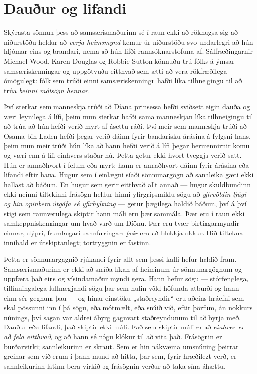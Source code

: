 \section*{Dauður og lifandi}

Skýrasta sönnun þess að samsærismaðurinn sé í raun ekki að rökhugsa sig að niðurstöðu heldur að \emph{verja heimsmynd} kemur úr niðurstöðu svo undarlegri að hún hljómar eins og brandari, nema að hún lifði rannsóknarstofuna af. Sálfræðingarnir Michael Wood, Karen Douglas og Robbie Sutton könnuðu trú fólks á ýmsar samsæriskenningar og uppgötvuðu eitthvað sem ætti að vera rökfræðilega ómögulegt: fólk sem trúði einni samsæriskenningu hafði líka tilhneigingu til að trúa \emph{beinni mótsögn hennar.}

Því sterkar sem manneskja trúði að Díana prinsessa hefði sviðsett eigin dauða og væri leynilega á lífi, þeim mun sterkar hafði sama manneskjan líka tilhneigingu til að trúa að hún hefði verið myrt af ásettu ráði. Því meir sem manneskja trúði að Osama bin Laden hefði þegar verið dáinn fyrir bandarísku árásina á fylgsni hans, þeim mun meir trúði hún líka að hann hefði verið á lífi þegar hermennirnir komu og væri enn á lífi einhvers staðar nú. Þetta getur ekki hvort tveggja verið satt. Hún er annaðhvort í felum eða myrt; hann er annaðhvort dáinn fyrir árásina eða lifandi eftir hana. Hugur sem í einlægni síaði sönnunargögn að sannleika gæti ekki hallast að báðum. En hugur sem gerir eitthvað allt annað — hugur skuldbundinn ekki neinni tiltekinni frásögn heldur hinni yfirgripsmiklu sögu að \emph{yfirvöldin ljúgi og hin opinbera útgáfa sé yfirhylming} — getur þægilega haldið báðum, því á því stigi sem raunverulega skiptir hann máli eru þær sammála. Þær eru í raun ekki samkeppniskenningar um hvað varð um Díönu. Þær eru tvær birtingarmyndir einnar, dýpri, frumlægari sannfæringar: \emph{þeir} eru að blekkja okkur. Hið tiltekna innihald er útskiptanlegt; tortryggnin er fastinn.

Þetta er sönnunargagnið rjúkandi fyrir allt sem þessi kafli hefur haldið fram. Samsærismaðurinn er ekki að smíða líkan af heiminum úr sönnunargögnum og uppfæra það eins og vísindamaður myndi gera. Hann hefur sögu — stórfenglega, tilfinningalega fullnægjandi sögu þar sem hulin völd höfunda atburði og hann einn sér gegnum þau — og hinar einstöku „staðreyndir“ eru aðeins hráefni sem skal pössunni inn í þá sögu, eða mótmælt, eða snúið við, eftir þörfum, án nokkurs núnings, því sagan var aldrei ábyrg gagnvart staðreyndunum til að byrja með. Dauður eða lifandi, það skiptir ekki máli. Það sem skiptir máli er að \emph{einhver er að fela eitthvað,} og að hann sé nógu klókur til að vita það. Frásögnin er burðarvirki; sannleikurinn er skraut. Sem er hin nákvæma umsnúning þeirrar greinar sem við erum í þann mund að hitta, þar sem, fyrir hræðilegt verð, er sannleikurinn látinn bera virkið og frásögnin verður að taka sína áhættu.

